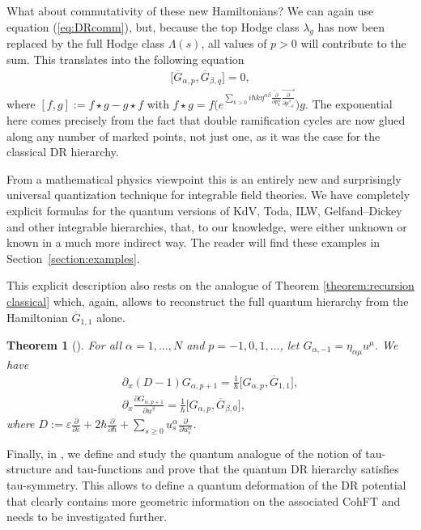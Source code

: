 \documentclass[pdftex]{sigma}
\numberwithin{equation}{section}
\newtheorem{Theorem}{Theorem}[section]
\newcommand{\<}{\left<}
\renewcommand{\>}{\right>}
\newcommand{\eps}{\varepsilon}
\newcommand{\oG}{{\overline G}}
\begin{document}
What about commutativity of these new Hamiltonians? We can again use equation (\ref{eq:DRcomm}), but, because the top Hodge class $\lambda_g$ has now been replaced by the full Hodge class $\Lambda(s)$, all values of $p>0$ will contribute to the sum. This translates into the following equation
\begin{gather*}\big[\oG_{\alpha,p}, \oG_{\beta,q}\big] = 0,\end{gather*}
where $[f,g]:=f\star g - g \star f$ with $f \star g =f \Big( e^{\sum\limits_{k>0} i \hbar k \eta^{\alpha \beta} \overleftarrow{\frac{\partial }{\partial p^\alpha_{k}}} \overrightarrow{\frac{\partial }{\partial p^\beta_{-k}}}}\Big) g$. The exponential here comes precisely from the fact that double ramif\/ication cycles are now glued along any number of marked points, not just one, as it was the case for the classical DR hierarchy.

From a mathematical physics viewpoint this is an entirely new and surprisingly universal quantization technique for integrable f\/ield theories. We have completely explicit formulas for the quantum versions of KdV, Toda, ILW, Gelfand--Dickey and other integrable hierarchies, that, to our knowledge, were either unknown or known in a much more indirect way. The reader will f\/ind these examples in Section~\ref{section:examples}.

This explicit description also rests on the analogue of Theorem \ref{theorem:recursion classical} which, again, allows to reconstruct the full quantum hierarchy from the Hamiltonian $\oG_{1,1}$ alone.

\begin{Theorem}[\cite{BR15}]\label{theorem:recursion}
For all $\alpha=1,\dots,N$ and $p=-1,0,1,\dots$, let $G_{\alpha,-1}=\eta_{\alpha\mu}u^\mu$. We have
\begin{gather}\label{eq:first recursion}
\partial_x (D-1) G_{\alpha,p+1} =\frac{1}{\hbar} \big[ G_{\alpha,p} , \oG_{1,1} \big],
\\ %
\partial_x \frac{\partial G_{\alpha,p+1}}{\partial u^\beta} =\frac{1}{\hbar} \big[G_{\alpha,p}, \oG_{\beta,0} \big],\nonumber
\end{gather}
where $D:=\eps\frac{\partial}{\partial\eps} + 2\hbar\frac{\partial}{\partial \hbar} + \sum\limits_{s\ge 0} u^\alpha_s\frac{\partial}{\partial u^\alpha_s}$.
\end{Theorem}

Finally, in \cite{BDGR16b}, we def\/ine and study the quantum analogue of the notion of tau-structure and tau-functions and prove that the quantum DR hierarchy satisf\/ies tau-symmetry. This allows to def\/ine a quantum deformation of the DR potential that clearly contains more geometric information on the associated CohFT and needs to be investigated further.
\end{document}
